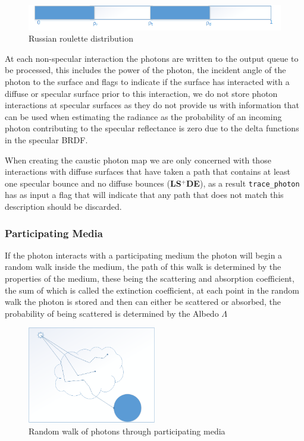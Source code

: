 \begin{figure}[h]
\includegraphics{./images/russian_roulette_distribution.png}
\caption{Russian roulette distribution}
\label{fig:rr_dist}
\end{figure}

At each non-specular interaction the photons are written to the output queue to be processed, this includes
the power of the photon, the incident angle of the photon to the surface and flags to indicate if the surface
has interacted with a diffuse or specular surface prior to this interaction, we do not store photon interactions
at specular surfaces as they do not provide us with information that can be used when estimating the radiance as
the probability of an incoming photon contributing to the specular reflectance is zero due to the delta functions
in the specular BRDF.

When creating the caustic photon map we are only concerned with those interactions with diffuse surfaces that have
taken a path that contains at least one specular bounce and no diffuse bounces (\textbf{LS$^+$DE}), as a result \texttt{trace\_photon}
has as input a flag that will indicate that any path that does not match this description should be discarded.

\subsubsection{Participating Media}
If the photon interacts with a participating medium the photon will begin a random walk inside the medium, the path of this walk
is determined by the properties of the medium, these being the scattering and absorption coefficient, the sum of which
is called the extinction coefficient, at each point in the random walk the photon is stored and then can either be
scattered or absorbed, the probability of being scattered is determined by the Albedo $\Lambda$

\begin{figure}
\centering
\includegraphics[width=0.5\textwidth]{./images/random_walk.png}
\caption{Random walk of photons through participating media}
\label{fig:random_walk}
\end{figure}

